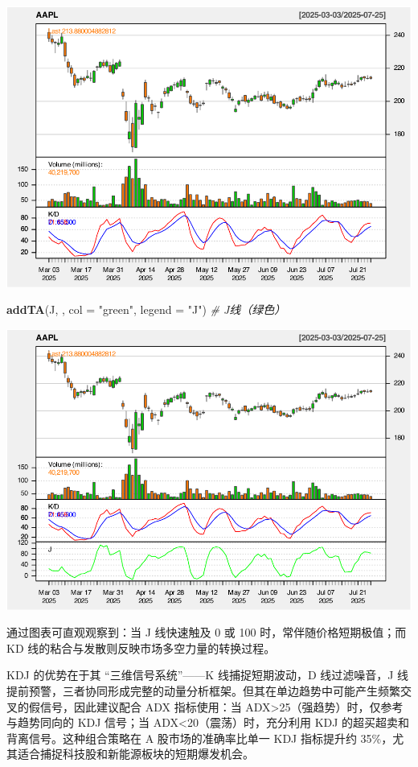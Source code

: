 \documentclass[]{ctexbook}
\newenvironment{Shaded}{\begin{snugshade}}{\end{snugshade}}
\newcommand{\AttributeTok}[1]{\textcolor[rgb]{0.13,0.29,0.53}{#1}}
\newcommand{\CommentTok}[1]{\textcolor[rgb]{0.56,0.35,0.01}{\textit{#1}}}
\newcommand{\FunctionTok}[1]{\textcolor[rgb]{0.13,0.29,0.53}{\textbf{#1}}}
\newcommand{\NormalTok}[1]{#1}
\newcommand{\StringTok}[1]{\textcolor[rgb]{0.31,0.60,0.02}{#1}}
\begin{document}
\includegraphics[width=0.9\linewidth]{QuantmodHandbook_files/figure-latex/kdj-3}

\begin{Shaded}
\begin{Highlighting}[]
\FunctionTok{addTA}\NormalTok{(J, , }\AttributeTok{col =} \StringTok{"green"}\NormalTok{, }\AttributeTok{legend =} \StringTok{"J"}\NormalTok{)  }\CommentTok{\# J线（绿色）}
\end{Highlighting}
\end{Shaded}

\includegraphics[width=0.9\linewidth]{QuantmodHandbook_files/figure-latex/kdj-4}

通过图表可直观观察到：当 J 线快速触及 0 或 100 时，常伴随价格短期极值；而 KD 线的粘合与发散则反映市场多空力量的转换过程。

KDJ 的优势在于其 ``三维信号系统''------K 线捕捉短期波动，D 线过滤噪音，J 线提前预警，三者协同形成完整的动量分析框架。但其在单边趋势中可能产生频繁交叉的假信号，因此建议配合 ADX 指标使用：当 ADX\textgreater25（强趋势）时，仅参考与趋势同向的 KDJ 信号；当 ADX\textless20（震荡）时，充分利用 KDJ 的超买超卖和背离信号。这种组合策略在 A 股市场的准确率比单一 KDJ 指标提升约 35\%，尤其适合捕捉科技股和新能源板块的短期爆发机会。
\end{document}
